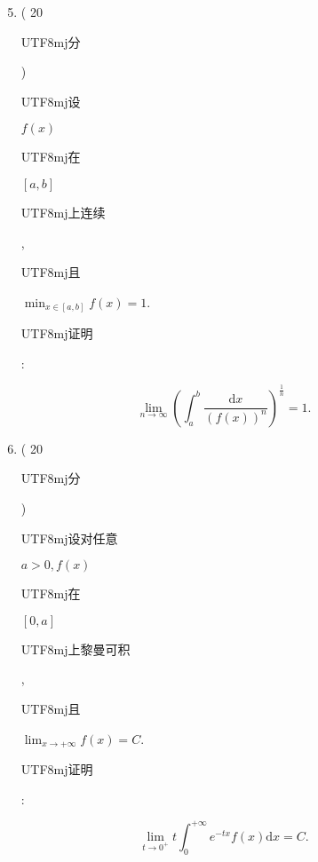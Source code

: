 \documentclass[10pt]{article}
\begin{document}
\begin{enumerate}
  \setcounter{enumi}{4}
  \item ( 20 \begin{CJK}{UTF8}{mj}分\end{CJK}) \begin{CJK}{UTF8}{mj}设\end{CJK} $f(x)$ \begin{CJK}{UTF8}{mj}在\end{CJK} $[a, b]$ \begin{CJK}{UTF8}{mj}上连续\end{CJK}, \begin{CJK}{UTF8}{mj}且\end{CJK} $\min _{x \in[a, b]} f(x)=1$. \begin{CJK}{UTF8}{mj}证明\end{CJK}:
\end{enumerate}
$$
\lim _{n \rightarrow \infty}\left(\int_{a}^{b} \frac{\mathrm{d} x}{(f(x))^{n}}\right)^{\frac{1}{n}}=1 .
$$

\begin{enumerate}
  \setcounter{enumi}{5}
  \item ( 20 \begin{CJK}{UTF8}{mj}分\end{CJK}) \begin{CJK}{UTF8}{mj}设对任意\end{CJK} $a>0, f(x)$ \begin{CJK}{UTF8}{mj}在\end{CJK} $[0, a]$ \begin{CJK}{UTF8}{mj}上黎曼可积\end{CJK}, \begin{CJK}{UTF8}{mj}且\end{CJK} $\lim _{x \rightarrow+\infty} f(x)=C$. \begin{CJK}{UTF8}{mj}证明\end{CJK}:
\end{enumerate}
$$
\lim _{t \rightarrow 0^{+}} t \int_{0}^{+\infty} e^{-t x} f(x) \mathrm{d} x=C .
$$
\end{document}
